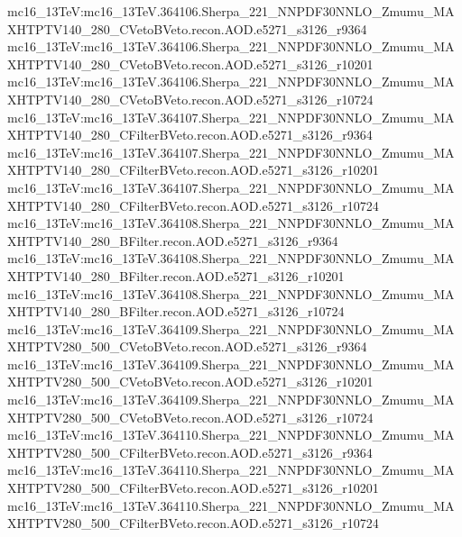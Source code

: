 { mc16\_13TeV:mc16\_13TeV.364106.Sherpa\_221\_NNPDF30NNLO\_Zmumu\_MAXHTPTV140\_280\_CVetoBVeto.recon.AOD.e5271\_s3126\_r9364 \newline    
 mc16\_13TeV:mc16\_13TeV.364106.Sherpa\_221\_NNPDF30NNLO\_Zmumu\_MAXHTPTV140\_280\_CVetoBVeto.recon.AOD.e5271\_s3126\_r10201 \newline    
 mc16\_13TeV:mc16\_13TeV.364106.Sherpa\_221\_NNPDF30NNLO\_Zmumu\_MAXHTPTV140\_280\_CVetoBVeto.recon.AOD.e5271\_s3126\_r10724 \newline    
 mc16\_13TeV:mc16\_13TeV.364107.Sherpa\_221\_NNPDF30NNLO\_Zmumu\_MAXHTPTV140\_280\_CFilterBVeto.recon.AOD.e5271\_s3126\_r9364 \newline    
 mc16\_13TeV:mc16\_13TeV.364107.Sherpa\_221\_NNPDF30NNLO\_Zmumu\_MAXHTPTV140\_280\_CFilterBVeto.recon.AOD.e5271\_s3126\_r10201 \newline    
 mc16\_13TeV:mc16\_13TeV.364107.Sherpa\_221\_NNPDF30NNLO\_Zmumu\_MAXHTPTV140\_280\_CFilterBVeto.recon.AOD.e5271\_s3126\_r10724 \newline    
 mc16\_13TeV:mc16\_13TeV.364108.Sherpa\_221\_NNPDF30NNLO\_Zmumu\_MAXHTPTV140\_280\_BFilter.recon.AOD.e5271\_s3126\_r9364 \newline    
 mc16\_13TeV:mc16\_13TeV.364108.Sherpa\_221\_NNPDF30NNLO\_Zmumu\_MAXHTPTV140\_280\_BFilter.recon.AOD.e5271\_s3126\_r10201 \newline    
 mc16\_13TeV:mc16\_13TeV.364108.Sherpa\_221\_NNPDF30NNLO\_Zmumu\_MAXHTPTV140\_280\_BFilter.recon.AOD.e5271\_s3126\_r10724 \newline    
 mc16\_13TeV:mc16\_13TeV.364109.Sherpa\_221\_NNPDF30NNLO\_Zmumu\_MAXHTPTV280\_500\_CVetoBVeto.recon.AOD.e5271\_s3126\_r9364 \newline    
 mc16\_13TeV:mc16\_13TeV.364109.Sherpa\_221\_NNPDF30NNLO\_Zmumu\_MAXHTPTV280\_500\_CVetoBVeto.recon.AOD.e5271\_s3126\_r10201 \newline    
 mc16\_13TeV:mc16\_13TeV.364109.Sherpa\_221\_NNPDF30NNLO\_Zmumu\_MAXHTPTV280\_500\_CVetoBVeto.recon.AOD.e5271\_s3126\_r10724 \newline    
 mc16\_13TeV:mc16\_13TeV.364110.Sherpa\_221\_NNPDF30NNLO\_Zmumu\_MAXHTPTV280\_500\_CFilterBVeto.recon.AOD.e5271\_s3126\_r9364  \newline   
 mc16\_13TeV:mc16\_13TeV.364110.Sherpa\_221\_NNPDF30NNLO\_Zmumu\_MAXHTPTV280\_500\_CFilterBVeto.recon.AOD.e5271\_s3126\_r10201 \newline    
 mc16\_13TeV:mc16\_13TeV.364110.Sherpa\_221\_NNPDF30NNLO\_Zmumu\_MAXHTPTV280\_500\_CFilterBVeto.recon.AOD.e5271\_s3126\_r10724 \newline    
}
